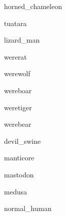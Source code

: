 \documentclass[letterpaper,serif]{module}
\begin{document}
\begin{newmonster}{horned_chameleon}\end{newmonster}

\begin{newmonster}{tuatara}\end{newmonster}

\begin{newmonster}{lizard_man}\end{newmonster}


\begin{newmonster}{wererat}\end{newmonster}

\begin{newmonster}{werewolf}\end{newmonster}

\begin{newmonster}{wereboar}\end{newmonster}

\begin{newmonster}{weretiger}\end{newmonster}

\begin{newmonster}{werebear}\end{newmonster}

\begin{newmonster}{devil_swine}\end{newmonster}

\begin{newmonster}{manticore}\end{newmonster}

\begin{newmonster}{mastodon}\end{newmonster}

\begin{newmonster}{medusa}\end{newmonster}


\begin{newmonster}{normal_human}\end{newmonster}
\end{document}
